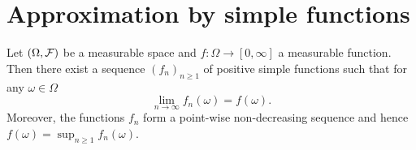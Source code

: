 \section{Approximation by simple functions}
\label{sec:simple-approximation}

\begin{proposition}\label{prop:approximation_simple}
Let $(\Omega, \mathcal F)$ be a measurable space and $f : \Omega \to [0,\infty]$ a measurable function. Then there exist a sequence $(f_n)_{n \ge 1}$ of positive simple functions such that for any $\omega \in \Omega$
\[
	\lim_{n \to \infty} f_n(\omega) = f(\omega).
\]
Moreover, the functions $f_n$ form a point-wise non-decreasing sequence and hence $f(\omega) = \sup_{n \ge 1} f_n(\omega)$.
\end{proposition}

